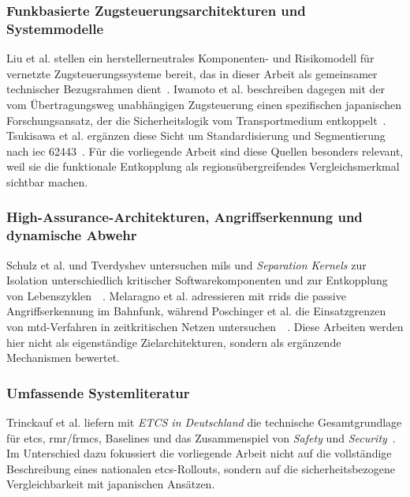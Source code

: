 \documentclass[runningheads]{res/llncs}
\begin{document}
\subsubsection{Funkbasierte Zugsteuerungsarchitekturen und Systemmodelle}
Liu et al. stellen ein herstellerneutrales Komponenten- und Risikomodell für vernetzte Zugsteuerungssysteme bereit, das in dieser Arbeit als gemeinsamer technischer Bezugsrahmen dient~\parencite[S. 1--15]{xiangliuCyber2020}. Iwamoto et al. beschreiben dagegen mit der vom Übertragungsweg unabhängigen Zugsteuerung einen spezifischen japanischen Forschungsansatz, der die Sicherheitslogik vom Transportmedium entkoppelt~\parencite[S. 1--12]{iwamotoTrain2024}. Tsukisawa et al. ergänzen diese Sicht um Standardisierung und Segmentierung nach \gls{iec} 62443~\parencite[S. 41--43]{h.tsukisawaStandardization2024}. Für die vorliegende Arbeit sind diese Quellen besonders relevant, weil sie die funktionale Entkopplung als regionsübergreifendes Vergleichsmerkmal sichtbar machen.

\subsubsection{High-Assurance-Architekturen, Angriffserkennung und dynamische Abwehr}
Schulz et al. und Tverdyshev untersuchen \gls{mils} und \textit{Separation Kernels} zur Isolation unterschiedlich kritischer Softwarekomponenten und zur Entkopplung von Lebenszyklen~\parencite[S. 31--35]{schulzIntegration2019}~\parencite[S. 80--83]{tverdyshevCertMILS2019}. Melaragno et al. adressieren mit \gls{rrids} die passive Angriffserkennung im Bahnfunk, während Poschinger et al. die Einsatzgrenzen von \gls{mtd}-Verfahren in zeitkritischen Netzen untersuchen~\parencite[S. 39--48]{melaragnoRail2016}~\parencite[S. 66--68, 121]{poschingerOpenMTD2020}. Diese Arbeiten werden hier nicht als eigenständige Zielarchitekturen, sondern als ergänzende Mechanismen bewertet.

\subsubsection{Umfassende Systemliteratur}
Trinckauf et al. liefern mit \textit{ETCS in Deutschland} die technische Gesamtgrundlage für \gls{etcs}, \gls{rmr}/\gls{frmcs}, Baselines und das Zusammenspiel von \textit{Safety} und \textit{Security}~\parencite[S. 49, 123, 204--211]{trinckaufETCS2024}. Im Unterschied dazu fokussiert die vorliegende Arbeit nicht auf die vollständige Beschreibung eines nationalen \gls{etcs}-Rollouts, sondern auf die sicherheitsbezogene Vergleichbarkeit mit japanischen Ansätzen.
\end{document}
